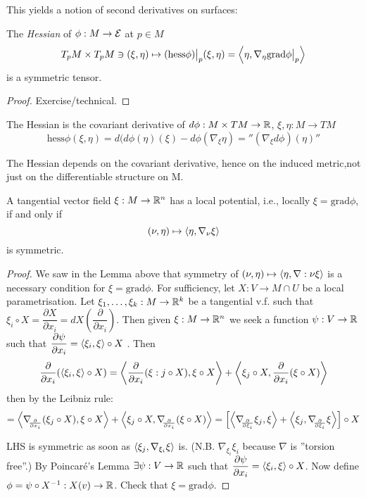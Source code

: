 This yields a notion of second derivatives on surfaces:

\begin{definition}
	
	The \emph{Hessian} of $ \phi: M \rightarrow \mathcal E $ at $ p \in M $
		\[ T_pM \times T_pM \ni (\xi,\eta) \mapsto (\mathrm{hess} \phi)\big|_p(\xi,\eta) = \left \langle \eta,\nabla_\eta \mathrm{grad}\phi\big|_p  \right\rangle \]
	is a symmetric tensor.
	
\end{definition}

\begin{proof}
	Exercise/technical.
\end{proof}

\begin{remark}
	
	The Hessian is the covariant derivative of $ d\phi: M \times TM \rightarrow \mathbb R $, $ \xi,\eta: M \rightarrow TM $
		\[ \mathrm{hess}\phi(\xi,\eta) = d(d\phi(\eta)(\xi)-d\phi(\nabla_\xi\eta) = ''(\nabla_\xi d\phi)(\eta)'' \]	
\end{remark}

The Hessian depends on the covariant derivative, hence on the induced metric,not just on the differentiable structure on M.

\begin{lemma}
	A tangential vector field $ \xi: M \rightarrow \mathbb R^n $ has a local potential, i.e., locally $ \xi = \mathrm{grad}\phi $, if and only if	
		\[ (\nu,\eta) \mapsto \left \langle \eta, \nabla_\nu \xi \right\rangle \] is symmetric.
\end{lemma}

\begin{proof}
	
	We saw in the Lemma above that symmetry of $ (\nu,\eta) \mapsto \left \langle \eta,\nabla:\nu \xi \right\rangle $ is a necessary condition for $ \xi = \mathrm{grad}\phi. $
	For sufficiency, let $ X: V \rightarrow M \cap U $ be a local parametrisation. Let $ \xi_1, \dots, \xi_k : M \rightarrow \mathbb R^k$ be a tangential v.f. such that $ \xi_i \circ X = \dfrac{\partial X}{\partial x_i} = dX(\dfrac{\partial}{\partial x_i}) $.
	Then given $ \xi: M \rightarrow \mathbb R^n $ we seek a function $ \psi: V\rightarrow \mathbb R $ such that $ \dfrac{\partial \psi}{\partial x_i} = \left \langle \xi_i, \xi \right\rangle \circ X $ . Then
		\[ \dfrac{\partial}{\partial x_i}(\left \langle \xi_i, \xi \right\rangle \circ X) = \left \langle  \dfrac{\partial}{\partial x_i}(\xi:j \circ X), \xi \circ X \right\rangle+ \left \langle \xi_j \circ X, \dfrac{\partial}{\partial x_i}(\xi \circ X) \right\rangle \] then by the Leibniz rule:
		\[ =\skal{\D{x_i} (\xi_j \circ X), \xi \circ X} + \skal{\xi_j \circ X,\D{x_i} (\xi \circ X)}
		= \left[ \skal{\D{\xi_i}\xi_j , \xi} + \skal{\xi_j, \D{\xi_i}\xi} \right]\circ X \]
	
	LHS is symmetric as soon as $ \left \langle  \xi_j, \nabla_{\xi_i} \xi \right\rangle $ is.
	(N.B. $ \nabla_{\xi_i}\xi_i $ because $ \nabla $ is ''torsion free''.)
	By Poincaré's Lemma $ \exists \psi: V \rightarrow \mathbb R $ such that $ \dfrac{\partial \psi}{\partial x_i}= \left \langle \xi_i,\xi \right\rangle \circ X $.
	Now define $ \phi = \psi \circ X^{-1}: X(v) \rightarrow \mathbb R $. Check that $ \xi = \mathrm{grad}\phi $.
\end{proof}

